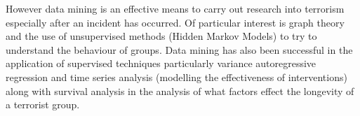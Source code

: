 However data mining is an effective means to carry out research into terrorism especially after an incident has occurred. Of particular interest is graph theory and the use of unsupervised methods (Hidden Markov Models) to try to understand the behaviour of groups. Data mining has also been successful in the application of supervised techniques particularly variance autoregressive regression and time series analysis (modelling the effectiveness of interventions) along with survival analysis in the analysis of what factors effect the longevity of a terrorist group.  

 

